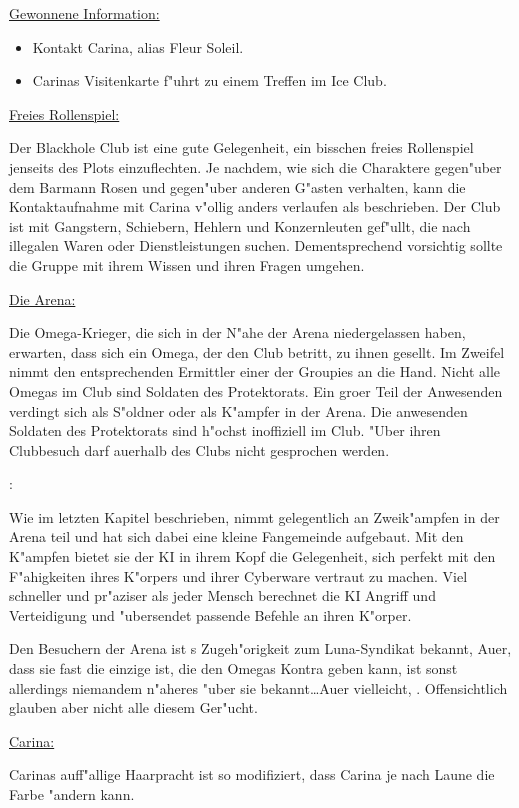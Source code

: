 \begin{remarks}
	\underline{Gewonnene Information:}

	\begin{itemize}
		\item Kontakt Carina, alias Fleur Soleil.
		\item Carinas Visitenkarte f"uhrt zu einem Treffen im Ice Club.
	\end{itemize}

	\underline{Freies Rollenspiel:}

	Der Blackhole Club ist eine gute Gelegenheit, ein bisschen freies Rollenspiel jenseits des Plots einzuflechten. Je nachdem, wie sich die Charaktere gegen"uber dem Barmann Rosen und gegen"uber anderen G"asten verhalten, kann die Kontaktaufnahme mit Carina v"ollig anders verlaufen als beschrieben. Der Club ist mit Gangstern, Schiebern, Hehlern und Konzernleuten gef"ullt, die nach illegalen Waren oder Dienstleistungen suchen. Dementsprechend vorsichtig sollte die Gruppe mit ihrem Wissen und ihren Fragen umgehen.

	\underline{Die Arena:}

	Die Omega-Krieger, die sich in der N"ahe der Arena niedergelassen haben, erwarten, dass sich ein Omega, der den Club betritt, zu ihnen gesellt. Im Zweifel nimmt den entsprechenden Ermittler einer der Groupies an die Hand. Nicht alle Omegas im Club sind Soldaten des Protektorats. Ein gro\3er Teil der Anwesenden verdingt sich als S"oldner oder als K"ampfer in der Arena. Die anwesenden Soldaten des Protektorats sind h"ochst inoffiziell im Club. "Uber ihren Clubbesuch darf au\3erhalb des Clubs nicht gesprochen werden.
\end{remarks}
\begin{remarks}
	\underline{\xl{}}:

	Wie im letzten Kapitel beschrieben, nimmt \xl{} gelegentlich an Zweik"ampfen in der Arena teil und hat sich dabei eine kleine Fangemeinde aufgebaut. Mit den K"ampfen bietet sie der KI in ihrem Kopf die Gelegenheit, sich perfekt mit den F"ahigkeiten ihres K"orpers und ihrer Cyberware vertraut zu machen. Viel schneller und pr"aziser als jeder Mensch berechnet die KI Angriff und Verteidigung und "ubersendet passende Befehle an ihren K"orper.

	Den Besuchern der Arena ist \xl{}s Zugeh"origkeit zum Luna-Syndikat bekannt, Au\3er, dass sie fast die einzige ist, die den Omegas Kontra geben kann, ist sonst allerdings niemandem n"aheres "uber sie bekannt\dots Au\3er vielleicht, . Offensichtlich glauben aber nicht alle diesem Ger"ucht.

	\underline{Carina:}
	
	Carinas auff"allige Haarpracht ist so modifiziert, dass Carina je nach Laune die Farbe "andern kann.
\end{remarks}


